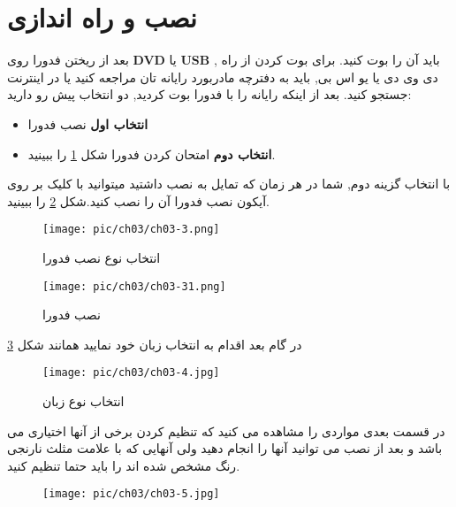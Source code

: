\section{نصب و راه اندازی}\label{se-22}
بعد از ریختن فدورا روی
\textbf{DVD}
یا
\textbf{USB}
, باید آن را بوت کنید. برای بوت کردن از راه دی وی دی یا یو اس بی, باید به دفترچه مادربورد رایانه تان مراجعه کنید یا در اینترنت جستجو کنید. بعد از اینکه رایانه را با فدورا بوت کردید, دو انتخاب پیش رو دارید:
\cite{install-fedora}
\begin{itemize}
	\item \textbf{انتخاب اول} 
	نصب فدورا 
	\item \textbf{انتخاب دوم}
	امتحان کردن فدورا
	شکل
\ref{pic-3}	
	را ببینید.
\end{itemize}
با انتخاب گزینه دوم, شما در هر زمان که تمایل به نصب داشتید میتوانید با کلیک بر روی آیکون نصب فدورا آن را نصب کنید.شکل 
\ref{pic-3-1}
را ببینید.
\begin{figure}[H]%
	\caption{ انتخاب نوع نصب فدورا}
	\begin{center}
		\texttt{[image: pic/ch03/ch03-3.png]}
	\end{center}
	\label{pic-3}
\end{figure}
\begin{figure}[H]%
	\caption{ نصب فدورا}
	\begin{center}
		\texttt{[image: pic/ch03/ch03-31.png]}
	\end{center}
	\label{pic-3-1}
\end{figure}
در گام بعد اقدام به انتخاب زبان خود نمایید همانند شکل
\ref{pic-4}
\begin{figure}[H]%
	\caption{ انتخاب نوع زبان }
	\begin{center}
		\texttt{[image: pic/ch03/ch03-4.jpg]}
	\end{center}
	\label{pic-4}
\end{figure}
در قسمت بعدی مواردی را مشاهده می کنید که تنظیم کردن برخی از آنها اختیاری می باشد و بعد از نصب می توانید آنها را انجام دهید ولی آنهایی که با علامت مثلث نارنجی رنگ مشخص شده اند را باید حتما تنظیم کنید.
\begin{figure}[H]%
	\begin{center}
		\texttt{[image: pic/ch03/ch03-5.jpg]}
	\end{center}
	\label{pic-5}
\end{figure}

